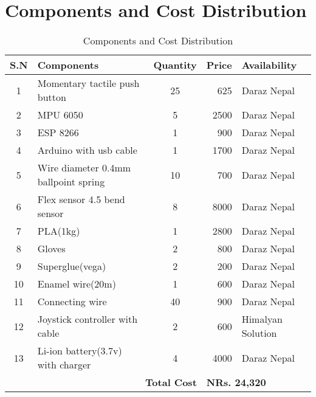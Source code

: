 \section*{Components and Cost Distribution}
\begin{table}[h]
\centering
\begin{tabular}{|c|l|c|r|l|}
\hline
\textbf{S.N} & \textbf{Components} & \textbf{Quantity} & \textbf{Price} & \textbf{Availability} \\
\hline
1 & Momentary tactile push button & 25 & 625 & Daraz Nepal \\
\hline

2 & MPU 6050 & 5 & 2500 & Daraz Nepal \\
\hline
3 & ESP 8266 & 1 & 900 & Daraz Nepal \\
\hline
4 & Arduino with usb cable & 1 & 1700 & Daraz Nepal \\
\hline
5 & Wire diameter 0.4mm ballpoint spring & 10 & 700 & Daraz Nepal \\
\hline
6 & Flex sensor 4.5 bend sensor & 8 & 8000 & Daraz Nepal \\
\hline
7 & PLA(1kg) & 1 & 2800 & Daraz Nepal \\
\hline
8 & Gloves & 2 & 800 & Daraz Nepal \\
\hline
9 & Superglue(vega) & 2 & 200 & Daraz Nepal \\
\hline
10 & Enamel wire(20m) & 1 & 600 & Daraz Nepal \\
\hline
11 & Connecting wire & 40 & 900 & Daraz Nepal \\
\hline
12 & Joystick controller with cable & 2 & 600 & Himalyan Solution \\
\hline
13 & Li-ion battery(3.7v) with charger & 4 & 4000 & Daraz Nepal \\
\hline
\multicolumn{3}{|r|}{\textbf{Total Cost}} & \multicolumn{2}{l|}{\textbf{NRs. 24,320}} \\
\hline
\end{tabular}
\caption{Components and Cost Distribution}
\end{table}